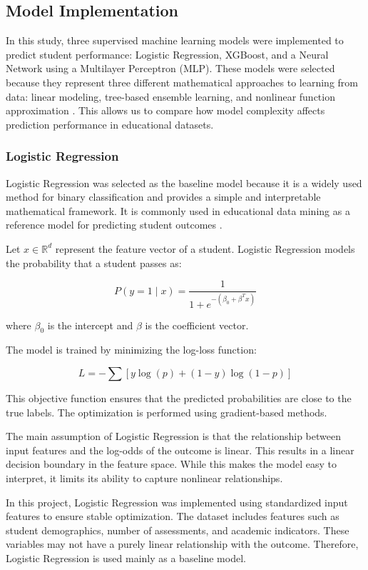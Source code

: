 \documentclass[conference]{IEEEtran}
\begin{document}
\subsection{Model Implementation}

In this study, three supervised machine learning models were implemented to predict student performance: Logistic Regression, XGBoost, and a Neural Network using a Multilayer Perceptron (MLP). These models were selected because they represent three different mathematical approaches to learning from data: linear modeling, tree-based ensemble learning, and nonlinear function approximation \cite{nayak2023}. This allows us to compare how model complexity affects prediction performance in educational datasets.

\subsubsection{Logistic Regression}

Logistic Regression was selected as the baseline model because it is a widely used method for binary classification and provides a simple and interpretable mathematical framework. It is commonly used in educational data mining as a reference model for predicting student outcomes \cite{sitompul2025}.

Let $x \in \mathbb{R}^d$ represent the feature vector of a student. Logistic Regression models the probability that a student passes as:

\[
P(y = 1 \mid x) = \frac{1}{1 + e^{-(\beta_0 + \beta^T x)}}
\]

where $\beta_0$ is the intercept and $\beta$ is the coefficient vector.

The model is trained by minimizing the log-loss function:

\[
L = - \sum \left[ y \log(p) + (1 - y) \log(1 - p) \right]
\]

This objective function ensures that the predicted probabilities are close to the true labels. The optimization is performed using gradient-based methods.

The main assumption of Logistic Regression is that the relationship between input features and the log-odds of the outcome is linear. This results in a linear decision boundary in the feature space. While this makes the model easy to interpret, it limits its ability to capture nonlinear relationships.

In this project, Logistic Regression was implemented using standardized input features to ensure stable optimization. The dataset includes features such as student demographics, number of assessments, and academic indicators. These variables may not have a purely linear relationship with the outcome. Therefore, Logistic Regression is used mainly as a baseline model.
\end{document}
